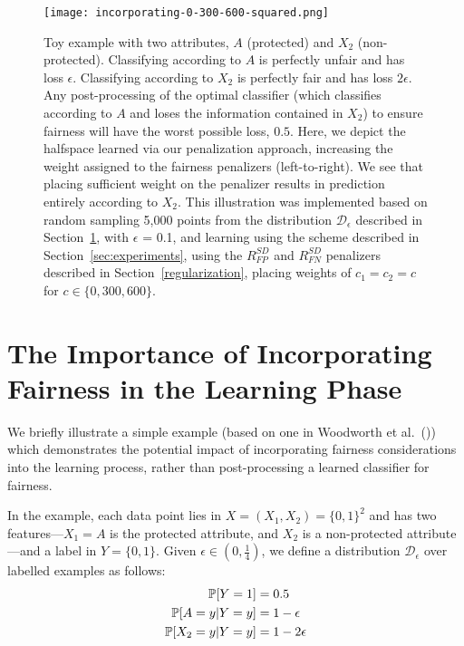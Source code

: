 \begin{figure*}[ht]
  \texttt{[image: incorporating-0-300-600-squared.png]}
  \caption{  Toy example with two attributes, $A$ (protected) and $X_2$ (non-protected). Classifying according to $A$ is perfectly unfair and has loss $\epsilon$. Classifying according to $X_2$ is perfectly fair and has loss $2 \epsilon$. Any post-processing of the optimal classifier (which classifies according to $A$ and loses the information contained in $X_2$) to ensure fairness will have the worst possible loss, $0.5$.  Here, we depict the halfspace learned via our penalization approach, increasing the weight assigned to the fairness penalizers (left-to-right). We see that placing sufficient weight on the penalizer results in prediction entirely according to $X_2$.
  This illustration was implemented based on random sampling 5,000 points from the distribution $\mathcal{D}_{\epsilon}$ described in Section~\ref{sec:incorporating}, with $\epsilon$ = 0.1, and learning using the scheme described in Section~\ref{sec:experiments}, using the $R_{FP}^{SD}$ and $R_{FN}^{SD}$ penalizers described in Section~\ref{regularization}, placing weights of $c_1=c_2=c$ for $c\in\{0,300,600\}$. }
  \label{fig:incorporating}
\end{figure*}


\section{The Importance of Incorporating Fairness in the Learning Phase} \label{sec:incorporating}
We briefly illustrate a simple example (based on one in Woodworth et al.~(\citeyear{woodworth})) which demonstrates the potential impact of incorporating fairness considerations into the learning process, rather than post-processing a learned classifier for fairness. 


In the example, each data point 
lies in $X = (X_1, X_2) = \{0,1\}^2$ and has two features---$X_1=A$ is the protected attribute, and $X_2$ is a non-protected attribute---and a label in $Y = \{0,1\}$. Given $\epsilon \in (0,\frac{1}{4})$, we define a distribution $\mathcal{D}_{\epsilon}$ over labelled examples as follows:
\begin{align*}
\operatorname*{\mathbb{P}}[Y=1] &= 0.5 \\ 
\operatorname*{\mathbb{P}}[A=y|Y=y] &= 1-\epsilon \\
\operatorname*{\mathbb{P}}[X_2=y|Y=y] &= 1-2\epsilon
\end{align*}

